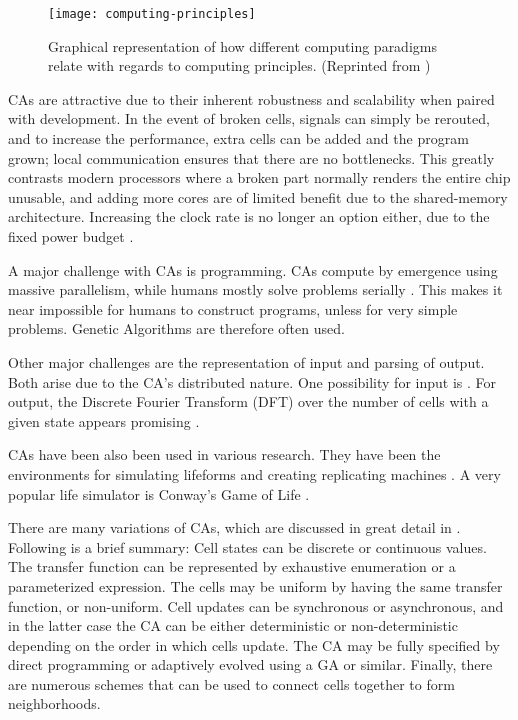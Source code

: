 \begin{figure}[!ht]
    \centering
    \texttt{[image: computing-principles]}
    \caption[Computing principles]{
        Graphical representation of how different computing paradigms relate with regards to computing principles.
        (Reprinted from \cite{sipper1999emergence})
    }
    \label{fig:computing-principles}
\end{figure}

CAs are attractive due to their inherent robustness and scalability when paired with development.
In the event of broken cells, signals can simply be rerouted, and to increase the performance, extra cells can be added and the program grown; local communication ensures that there are no bottlenecks.
This greatly contrasts modern processors where a broken part normally renders the entire chip unusable, and adding more cores are of limited benefit due to the shared-memory architecture.
Increasing the clock rate is no longer an option either, due to the fixed power budget .

A major challenge with CAs is programming.
CAs compute by emergence using massive parallelism, while humans mostly solve problems serially \cite{newell1972problemsolving}.
This makes it near impossible for humans to construct programs, unless for very simple problems.
Genetic Algorithms are therefore often used.

Other major challenges are the representation of input and parsing of output.
Both arise due to the CA's distributed nature.
One possibility for input is .
For output, the Discrete Fourier Transform (DFT) over the number of cells with a given state appears promising \cite{berg2013ca}.

CAs have been also been used in various research.
They have been the environments for simulating lifeforms and creating replicating machines \cite{neumann1966selfreplication}.
A very popular life simulator is Conway's Game of Life \cite{gardner1970life}.

There are many variations of CAs, which are discussed in great detail in \cite{sipper1999emergence}.
Following is a brief summary:
Cell states can be discrete or continuous values.
The transfer function can be represented by exhaustive enumeration or a parameterized expression.
The cells may be uniform by having the same transfer function, or non-uniform.
Cell updates can be synchronous or asynchronous, and in the latter case the CA can be either deterministic or non-deterministic depending on the order in which cells update.
The CA may be fully specified by direct programming or adaptively evolved using a GA or similar.
Finally, there are numerous schemes that can be used to connect cells together to form neighborhoods.

